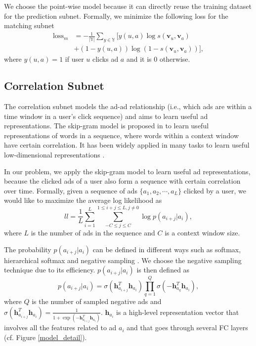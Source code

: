 \documentclass{article}
\begin{document}
We choose the point-wise model because it can directly reuse the training dataset for the prediction subnet.
Formally, we minimize the following loss for the matching subnet
\begin{align}
\mathrm{loss}_m &= - \frac{1}{|\mathbb{Y}|}\sum_{y \in \mathbb{Y}} \big[y(u,a) \log s(\mathbf{v}_u, \mathbf{v}_a) \nonumber \\
&+ (1 - y(u,a)) \log (1 - s(\mathbf{v}_u, \mathbf{v}_a)) \big], \label{loss_m}
\end{align}
where $y(u,a) = 1$ if user $u$ clicks ad $a$ and it is $0$ otherwise.

\subsection{Correlation Subnet}
The correlation subnet models the ad-ad relationship (i.e., which ads are within a time window in a user's click sequence) and aims to learn useful ad representations.
The skip-gram model is proposed in \cite{mikolov2013distributed} to learn useful representations of words in a sequence, where words within a context window have certain correlation. It has been widely applied in many tasks to learn useful low-dimensional representations \cite{zhao2018learning,zhou2018deep}.

In our problem, we apply the skip-gram model to learn useful ad representations, because the clicked ads of a user also form a sequence with certain correlation over time. Formally, given a sequence of ads $\{a_1, a_2, \cdots, a_L\}$ clicked by a user, we would like to maximize the average log likelihood as
\[
ll = \frac{1}{L} \sum_{i=1}^L \sum_{-C \leq j \leq C}^{1\leq i+j \leq L, j \neq 0} \log p(a_{i+j} | a_i),
\]
where $L$ is the number of ads in the sequence and $C$ is a context window size.

The probability $p(a_{i+j} | a_i)$ can be defined in different ways such as softmax, hierarchical softmax and negative sampling \cite{mikolov2013distributed}. We choose the negative sampling technique due to its efficiency. $p(a_{i+j} | a_i)$ is then defined as
\[
p(a_{i+j} | a_i) = \sigma(\mathbf{h}_{a_{i+j}}^T \mathbf{h}_{a_i}) \prod_{q=1}^Q  \sigma(-\mathbf{h}_{a_q}^T \mathbf{h}_{a_i}),
\]
where $Q$ is the number of sampled negative ads and
$
\sigma(\mathbf{h}_{a_{i+j}}^T \mathbf{h}_{a_i}) = \frac{1}{1 + \exp(- \mathbf{h}_{a_{i+j}}^T \mathbf{h}_{a_i})}.
$
$\mathbf{h}_{a_i}$ is a high-level representation vector that involves all the features related to ad $a_i$ and that goes through several FC layers (cf. Figure \ref{model_detail}).
\end{document}
